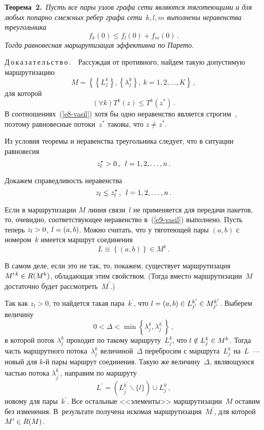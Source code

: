 \begin{multicols}{2}
  \medskip
  
  \noindent
  \textbf{Теорема~2.}\ \textit{Пусть все пары узлов графа сети являются 
тяготеющими и для любых попарно смежных ребер графа сети~$k, l, m$ выполнены 
неравенства треугольника
  $$
  f_k(0)\leq f_l(0)+f_m(0)\,.
  $$
  Тогда равновесная маршрутизация эффективна по Парето.} 
  
  \medskip
  
  \noindent
  Д\,о\,к\,а\,з\,а\,т\,е\,л\,ь\,с\,т\,в\,о\,.\ \ Рассуждая от противного, найдем такую 
допустимую маршрутизацию
  $$
  M=\left\{ \left\{ L_j^k\right\}, \left\{ \lambda_j^k\right\},\ k=1,2,\ldots , K\right\}\,,
  $$
  для которой 
  \begin{equation}
  \left(\forall k \right) T^k(z)\leq T^k(z^*)\,.
  \label{e8-vasil}
  \end{equation}
    В соотношениях~(\ref{e8-vasil}) хотя бы одно неравенство является 
строгим~\cite{13-vasil}, поэтому равновесные потоки~$z^*$ таковы, что 
$z\not=z^*$. 
  
  Из условия теоремы и неравенства треугольника следует, что в ситуации 
равновесия
  $$
  z_l^*> 0\,,\enskip l=1,2,\ldots ,n\,.
  $$
  
  Докажем справедливость неравенства
  \begin{equation}
  z_l\leq z_l^*\,,\enskip l=1,2,\ldots ,n\,.
  \label{e9-vasil}
  \end{equation}
  
  Если в маршрутизации $M$ линия связи~$l$ не применяется для передачи 
пакетов, то, очевидно, соответствующее неравенство в~(\ref{e9-vasil}) выполнено. 
Пусть теперь $z_l\hm> 0$, $l\hm=(a,b)$. Можно считать, что у тяготеющей пары 
$(a,b)$ с номером~$k$ имеется маршрут соединения
  $$
  L\equiv \left\{ (a,b)\right\} \in M^k\,.
  $$
  
  В самом деле, если это не так, то, покажем, существует маршрутизация 
$M^{\prime\,k} \hm\in R(M^k)$, обладающая этим свойством. (Тогда вместо 
маршрутизации~$M$ достаточно будет рассмотреть~$M^\prime$.)
  
  Так как $z_l>0$, то найдется такая пара~$k^\prime$, что $l\hm= (a,b)\hm\in 
L_{j^\prime}^{k^\prime}\hm\in M_{j^\prime}^{k^\prime}$. Выберем величину
  $$
  0<\Delta <\min \left\{ \lambda_j^k,\lambda_j^{k^\prime}\right\}\,,
  $$
в которой поток $\lambda_j^k$ проходит по такому маршруту~$L_j^k$, что $l\notin 
L_j^k\hm\in M^k$. Тогда часть маршрутного потока~$\lambda_j^k$ 
величиной~$\Delta$ перебросим с маршрута~$L_j^k$ на~$L$~--- новый для $k$-й 
пары маршрут соединения. Такую же величину~$\Delta$, являющуюся частью 
потока $\lambda_{j^\prime}^{k^\prime}$, направим по маршруту
$$
L^\prime =\left( L_{j^\prime}^{k^\prime} \backslash \{l\}\right)\cup L_j^k\,,
$$
новому для пары~$k^\prime$. Все остальные <<элементы>> маршрутизации~$M$ 
оставим без изменения. В~результате получена искомая 
маршрутизация~$M^\prime$, для которой $M^\prime\hm\in R(M)$.


\end{multicols}

